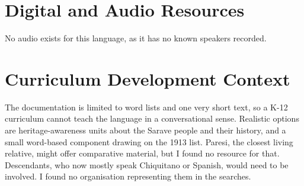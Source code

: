 \documentclass[12pt]{article}
\begin{document}
\section{Digital and Audio Resources}
No audio exists for this language, as it has no known speakers recorded.

\section{Curriculum Development Context}
The documentation is limited to word lists and one very short text, so a K-12 curriculum cannot teach the language in a conversational sense. Realistic options are heritage-awareness units about the Sarave people and their history, and a small word-based component drawing on the 1913 list. Paresi, the closest living relative, might offer comparative material, but I found no resource for that. Descendants, who now mostly speak Chiquitano or Spanish, would need to be involved. I found no organisation representing them in the searches.
\end{document}
